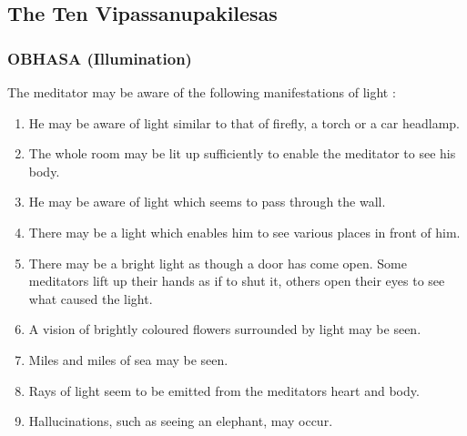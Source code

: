 \documentclass[a5paper,10pt,english]{book}
\begin{document}
\subsection{The Ten Vipassanupakilesas}
\label{\detokenize{progress:the-ten-vipassanupakilesas}}

\subsubsection{OBHASA (Illumination)}
\label{\detokenize{progress:obhasa-illumination}}
\sphinxAtStartPar
The meditator may be aware of the following manifestations of light :\sphinxhyphen{}
\begin{enumerate}
%
\item {} 
\sphinxAtStartPar
He may be aware of light similar to that of firefly, a torch or a car headlamp.

\item {} 
\sphinxAtStartPar
The whole room may be lit up sufficiently to enable the meditator to see his body.

\item {} 
\sphinxAtStartPar
He may be aware of light which seems to pass through the wall.

\item {} 
\sphinxAtStartPar
There may be a light which enables him to see various places in front of him.

\item {} 
\sphinxAtStartPar
There may be a bright light as though a door has come open. Some meditators lift up their hands as if to shut it, others open their eyes to see what caused the light.

\item {} 
\sphinxAtStartPar
A vision of brightly coloured flowers surrounded by light may be seen.

\item {} 
\sphinxAtStartPar
Miles and miles of sea may be seen.

\item {} 
\sphinxAtStartPar
Rays of light seem to be emitted from the meditators heart and body.

\item {} 
\sphinxAtStartPar
Hallucinations, such as seeing an elephant, may occur.

\end{enumerate}
\end{document}
